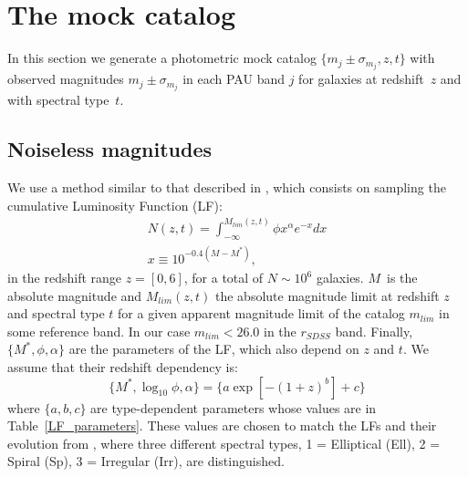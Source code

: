 \section{The mock catalog}
\label{sec:mock}

In this section we generate a photometric mock catalog $\lbrace m_j \pm \sigma_{m_j}, z,t \rbrace$ with observed magnitudes $m_j\pm\sigma_{m_j}$ in each PAU band $j$ for galaxies at redshift~$z$ and with spectral type~$t$.

\subsection{Noiseless magnitudes}
We use a method similar to that described in \citet{Jouvel2009}, which consists on sampling the cumulative Luminosity Function (LF): 
\begin{eqnarray}
N(z,t) = \int_{-\infty}^{M_{lim}(z,t)} \phi x^\alpha e^{-x} dx \nonumber \\
x\equiv10^{-0.4(M-M^*)},
\label{z_dist}
\end{eqnarray}
in the redshift range $z=[0,6]$, for a total of $N\sim10^6$ galaxies. $M$~is the absolute magnitude and $M_{lim}(z,t)$ the absolute magnitude limit at redshift $z$ and spectral type $t$ for a given apparent magnitude limit of the catalog $m_{lim}$ in some reference band. In our case $m_{lim}<26.0$ in the $r_{SDSS}$ band. Finally, $\lbrace M^*, \phi, \alpha \rbrace$ are the parameters of the LF, which also depend on $z$ and $t$. We assume that their redshift dependency is:
\begin{equation}
 \lbrace M^*, \log_{10}\phi, \alpha \rbrace = \lbrace a \exp[-(1+z)^{b}] + c \rbrace
\label{LF_param_evolv}
\end{equation}
where $\lbrace a, b, c \rbrace$ are type-dependent parameters whose values are in Table~\ref{LF_parameters}. These values are chosen to match the LFs and their evolution from \cite{Dahlen2005}, where three different spectral types, 1 = Elliptical (Ell), 2 = Spiral (Sp), 3 = Irregular (Irr), are distinguished. 
